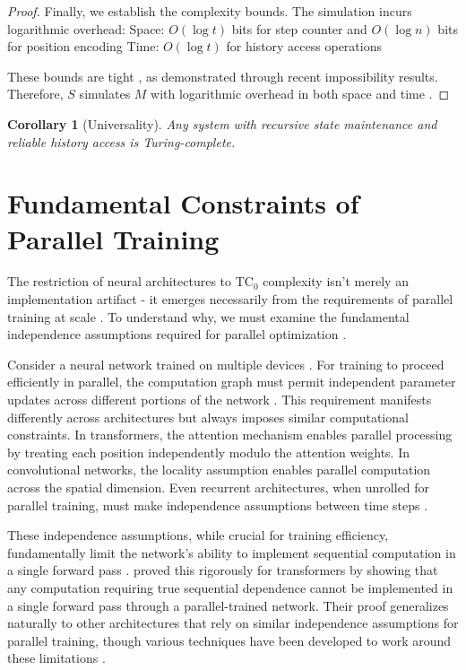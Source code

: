 \documentclass[12pt]{article}
\newtheorem{corollary}[theorem]{Corollary}
\begin{document}
\begin{proof}
Finally, we establish the complexity bounds. The simulation incurs logarithmic overhead:
Space: $O(\log t)$ bits for step counter and $O(\log n)$ bits for position encoding
Time: $O(\log t)$ for history access operations

These bounds are tight \cite{parzych2024memory,hhan2024new,boyle2024memory}, as demonstrated through recent impossibility results. Therefore, $S$ simulates $M$ with logarithmic overhead in both space and time \cite{savage1994space,vonkorff2019molecular,bennett1989time}.
\end{proof}

\begin{corollary}[Universality]
Any system with recursive state maintenance and reliable history access is Turing-complete.
\end{corollary}

\section{Fundamental Constraints of Parallel Training}

The restriction of neural architectures to $\text{TC}_0$ complexity isn't merely an implementation artifact - it emerges necessarily from the requirements of parallel training at scale \cite{merrill2023parallelism,peng2024limitations}. To understand why, we must examine the fundamental independence assumptions required for parallel optimization \cite{shallue2019measuring}.

Consider a neural network trained on multiple devices \cite{zhao2024epha}. For training to proceed efficiently in parallel, the computation graph must permit independent parameter updates across different portions of the network \cite{barrett2019analyzing}. This requirement manifests differently across architectures but always imposes similar computational constraints. In transformers, the attention mechanism enables parallel processing by treating each position independently modulo the attention weights. In convolutional networks, the locality assumption enables parallel computation across the spatial dimension. Even recurrent architectures, when unrolled for parallel training, must make independence assumptions between time steps \cite{dickson2023rnns}.

These independence assumptions, while crucial for training efficiency, fundamentally limit the network's ability to implement sequential computation in a single forward pass \cite{wei2022chain}. \cite{merrill2023parallelism} proved this rigorously for transformers by showing that any computation requiring true sequential dependence cannot be implemented in a single forward pass through a parallel-trained network. Their proof generalizes naturally to other architectures that rely on similar independence assumptions for parallel training, though various techniques have been developed to work around these limitations \cite{stillman2023generative}.
\end{document}
